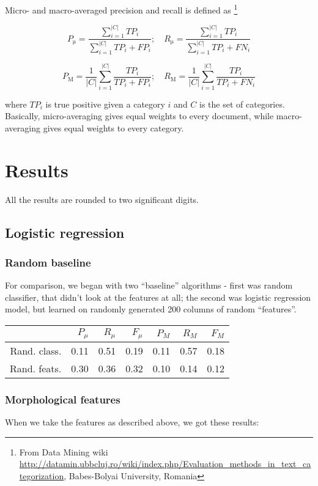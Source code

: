 \documentclass[letterpaper]{article}
\begin{document}
Micro- and macro-averaged precision and recall is defined as \footnote{From Data Mining wiki  \url{http://datamin.ubbcluj.ro/wiki/index.php/Evaluation_methods_in_text_categorization}, Babes-Bolyai University, Romania} 

$$P_{\mathrm{\mu}} = \frac{\sum_{i=1}^{|C|}TP_{i}}{\sum_{i=1}^{|C|}TP_{i}+FP_{i}}; \quad R_{\mathrm{\mu}} = \frac{\sum_{i=1}^{|C|}TP_{i}}{\sum_{i=1}^{|C|}TP_{i}+FN_{i}}$$

$$P_{\mathrm{M}}=\frac{1}{|C|}\sum_{i=1}^{|C|}\frac{TP_{i}}{TP_{i}+FP_{i}};\quad R_{\mathrm{M}}=\frac{1}{|C|}\sum_{i=1}^{|C|}\frac{TP_{i}}{TP_{i}+FN_{i}}$$

where $TP_i$ is true positive given a category $i$ and $C$ is the set of categories. Basically, micro-averaging gives equal weights to every document, while macro-averaging gives equal weights to every category.

\section{Results}
All the results are rounded to two significant digits.
\subsection{Logistic regression}
\subsubsection{Random baseline}

For comparison, we began with two ``baseline'' algorithms - first was random classifier, that didn't look at the features at all; the second was logistic regression model, but learned on randomly generated 200 columns of random ``features''.

\begin{table}[h]
\begin{tabular}{|r|r|r|r|r|r|r|}
 \hline
 & $P_\mu$ & $R_\mu$ & $F_\mu$ & $P_M$ & $R_M$  & $F_M$ \\ \hline
Rand. class. & 0.11 & 0.51 & 0.19 & 0.11 & 0.57 & 0.18 \\ \hline
Rand. feats. & 0.30 & 0.36 & 0.32 & 0.10 & 0.14 & 0.12 \\ \hline
\end{tabular}
\end{table}

\subsubsection{Morphological features}
When we take the features as described above, we got these results:
\end{document}
